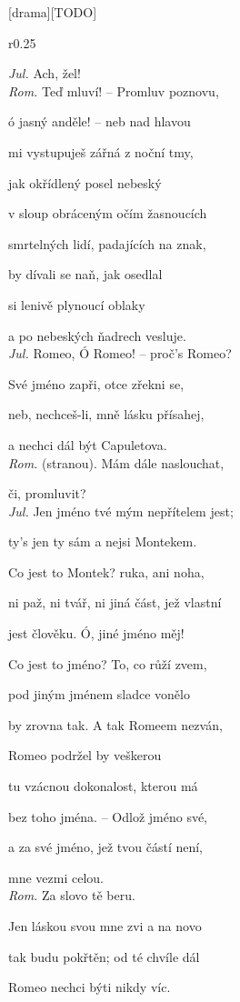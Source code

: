 \documentclass{extarticle} %
\begin{document}
\newpage


\changefontsize{8pt}

[drama][TODO]

\noindent\begin{wrapfigure}{r}{0.25\textwidth}
\tiny

\setlength{\parindent}{3pt}
\noindent \textit{Jul.} Ach, žel! \\
\textit{Rom.} Teď mluví! -- Promluv poznovu, \par
ó jasný anděle! -- neb nad hlavou \par
mi vystupuješ zářná z noční tmy, \par
jak okřídlený posel nebeský \par
v sloup obráceným očím žasnoucích \par
smrtelných lidí, padajících na znak, \par
by dívali se naň, jak osedlal \par
si lenivě plynoucí oblaky \par
a po nebeských ňadrech vesluje. \\
\textit{Jul.} Romeo, Ó Romeo! -- proč's Romeo? \par
Své jméno zapři, otce zřekni se, \par
neb, nechceš-li, mně lásku přísahej, \par
a nechci dál být Capuletova. \\
\textit{Rom.} (stranou). Mám dále naslouchat, \par 
či, promluvit? \\
\textit{Jul.} Jen jméno tvé mým nepřítelem jest; \par
ty's jen ty sám a nejsi Montekem. \par
Co jest to Montek? ruka, ani noha, \par
ni paž, ni tvář, ni jiná část, jež vlastní \par
jest člověku. Ó, jiné jméno měj! \par
Co jest to jméno? To, co růží zvem, \par
pod jiným jménem sladce vonělo \par
by zrovna tak. A tak Romeem nezván, \par
Romeo podržel by veškerou \par
tu vzácnou dokonalost, kterou má \par
bez toho jména. -- Odlož jméno své, \par
a za své jméno, jež tvou částí není, \par
mne vezmi celou. \\
\textit{Rom.} Za slovo tě beru. \par
Jen láskou svou mne zvi a na novo \par
tak budu pokřtěn; od té chvíle dál \par
Romeo nechci býti nikdy víc. 
\end{wrapfigure}
\end{document}
